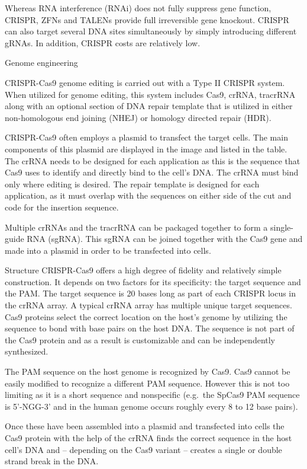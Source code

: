 Whereas RNA interference (RNAi) does not fully suppress gene function, CRISPR, ZFNs and TALENs provide full irreversible gene knockout. CRISPR can also target several DNA sites simultaneously by simply introducing different gRNAs. In addition, CRISPR costs are relatively low.

Genome engineering

CRISPR-Cas9 genome editing is carried out with a Type II CRISPR system. When utilized for genome editing, this system includes Cas9, crRNA, tracrRNA along with an optional section of DNA repair template that is utilized in either non-homologous end joining (NHEJ) or homology directed repair (HDR).

CRISPR-Cas9 often employs a plasmid to transfect the target cells. The main components of this plasmid are displayed in the image and listed in the table. The crRNA needs to be designed for each application as this is the sequence that Cas9 uses to identify and directly bind to the cell's DNA. The crRNA must bind only where editing is desired. The repair template is designed for each application, as it must overlap with the sequences on either side of the cut and code for the insertion sequence.

Multiple crRNAs and the tracrRNA can be packaged together to form a single-guide RNA (sgRNA). This sgRNA can be joined together with the Cas9 gene and made into a plasmid in order to be transfected into cells.

Structure
CRISPR-Cas9 offers a high degree of fidelity and relatively simple construction. It depends on two factors for its specificity: the target sequence and the PAM. The target sequence is 20 bases long as part of each CRISPR locus in the crRNA array. A typical crRNA array has multiple unique target sequences. Cas9 proteins select the correct location on the host's genome by utilizing the sequence to bond with base pairs on the host DNA. The sequence is not part of the Cas9 protein and as a result is customizable and can be independently synthesized.

The PAM sequence on the host genome is recognized by Cas9. Cas9 cannot be easily modified to recognize a different PAM sequence. However this is not too limiting as it is a short sequence and nonspecific (e.g.~the SpCas9 PAM sequence is 5'-NGG-3' and in the human genome occurs roughly every 8 to 12 base pairs).

Once these have been assembled into a plasmid and transfected into cells the Cas9 protein with the help of the crRNA finds the correct sequence in the host cell's DNA and -- depending on the Cas9 variant -- creates a single or double strand break in the DNA.

